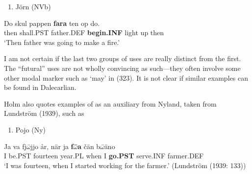 \begin{enumerate} %
\item 
Jörn (NVb)

\end{enumerate} %
\ea\label{}
\gll Do  skul  pappen  \textbf{fara} ten  op  do.\\


then  shall.PST  father.DEF  \textbf{begin.INF} light  up  then\\ %


‘Then father was going to make a fire.’
\z


I am not certain if the last two groups of uses are really distinct from the first. The “futural” uses are not wholly convincing as such—they often involve some other modal marker such as  ‘may’ in (323). It is not clear if similar examples can be found in Dalecarlian. 

Holm also quotes examples of  as an auxiliary from Nyland, taken from Lundström (1939), such as

\begin{enumerate} %
\item 
Pojo (Ny) 

\end{enumerate} %
\ea\label{}
\gll Ja  va  fj$\omega $\={ }jjo   år,  när  ja  \textbf{f}\textbf{$\omega $}\textbf{\={ }a} čän  b$\omega $\={ }äno   \\


I  be.PST  fourteen  year.PL  when  I  \textbf{go.PST} serve.INF  farmer.DEF  \\ %


‘I was fourteen, when I started working for the farmer.’ (Lundström (1939: 133))
\z

